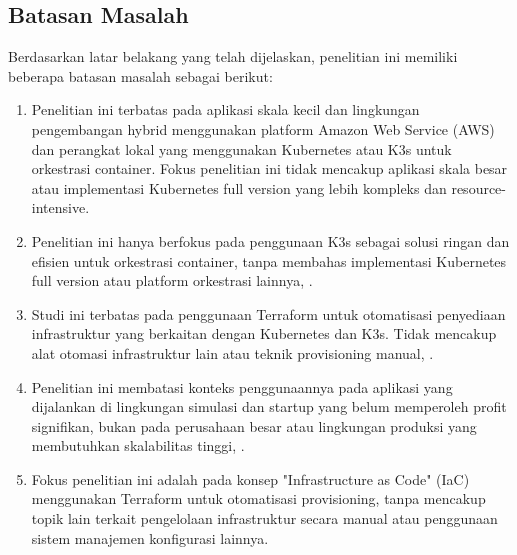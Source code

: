 \subsection{Batasan Masalah}

Berdasarkan latar belakang yang telah dijelaskan, penelitian ini memiliki beberapa batasan masalah sebagai berikut:

\begin{enumerate}
    \item Penelitian ini terbatas pada aplikasi skala kecil dan lingkungan pengembangan hybrid menggunakan platform Amazon Web Service (AWS) dan perangkat lokal yang menggunakan Kubernetes atau K3s untuk orkestrasi container. Fokus penelitian ini tidak mencakup aplikasi skala besar atau implementasi Kubernetes full version yang lebih kompleks dan resource-intensive.
    
    \item Penelitian ini hanya berfokus pada penggunaan K3s sebagai solusi ringan dan efisien untuk orkestrasi container, tanpa membahas implementasi Kubernetes full version atau platform orkestrasi lainnya, \cite{K3s}.
    
    \item Studi ini terbatas pada penggunaan Terraform untuk otomatisasi penyediaan infrastruktur yang berkaitan dengan Kubernetes dan K3s. Tidak mencakup alat otomasi infrastruktur lain atau teknik provisioning manual, \cite{Terraform}.
    
    \item Penelitian ini membatasi konteks penggunaannya pada aplikasi yang dijalankan di lingkungan simulasi dan startup yang belum memperoleh profit signifikan, bukan pada perusahaan besar atau lingkungan produksi yang membutuhkan skalabilitas tinggi, \cite{CNCF_Survey}.
    
    \item Fokus penelitian ini adalah pada konsep "Infrastructure as Code" (IaC) menggunakan Terraform untuk otomatisasi provisioning, tanpa mencakup topik lain terkait pengelolaan infrastruktur secara manual atau penggunaan sistem manajemen konfigurasi lainnya.
\end{enumerate}

